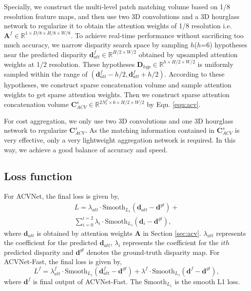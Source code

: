 \documentclass[10pt,twocolumn,letterpaper]{article}
\begin{document}
Specially, we construct the multi-level patch matching volume based on 1/8 resolution feature maps, and then use two 3D convolutions and a 3D hourglass network to regularize it to obtain the attention weights of 1/8 resolution i.e. $\mathbf{A}^{f}\in\mathbb{R}^{1\times{D}/8\times{H}/8\times{W}/8}$. To achieve real-time performance without sacrificing too much accuracy, we narrow disparity search space by sampling $h$($h$=6) hypotheses near the predicted disparity $\mathbf{d}_{att}^{f}\in\mathbb{R}^{H/2\times{W/2}}$ obtained by upsampled attention weights at 1/2 resolution. These hypotheses $\mathbf{D}_{hyp}\in\mathbb{R}^{h\times{H/2}\times{W/2}}$ is uniformly sampled within the range of $(\mathbf{d}_{att}^{f}-h/2, \mathbf{d}_{att}^{f}+h/2)$. According to these hypotheses, we construct sparse concatenation volume and sample attention weights to get sparse attention weights. Then we construct sparse attention 
concatenation volume $\mathbf{C}_{ACV}^s\in\mathbb{R}^{2N_c^f\times{6}\times{H}/2\times{W}/2}$ by Equ. \ref{equ:acv}.

For cost aggregation, we only use two 3D convolutions and one 3D hourglass network to regularize $\mathbf{C}_{ACV}^s$. As the matching information contained in $\mathbf{C}_{ACV}^s$ is very effective, only a very lightweight aggregation network is required.
In this way, we achieve a good balance of accuracy and speed.

\subsection{Loss function} \label{sec:loss}
For ACVNet, the final loss is given by,
\begin{equation}
\begin{split}
	L=\lambda_{att}\cdot\text{Smooth}_{L_1}(\mathbf{{d}}_{att}-\mathbf{d}^{gt})+\\ \sum_{i=0}^{i=2}\lambda_i\cdot\text{Smooth}_{L_1}(\mathbf{d}_i-\mathbf{d}^{gt}),
\end{split}
\label{equ:loss}
\end{equation}
where $\mathbf{d}_{att}$ is obtained by attention weights $\mathbf{A}$ in Section \ref{sec:acv}. $\lambda_{att}$ represents the coefficient for the predicted $\mathbf{{d}}_{att}$,  $\lambda_i$ represents the coefficient for the $ith$ predicted disparity and $\mathbf{d}^{gt}$ denotes the ground-truth disparity map. 
For ACVNet-Fast, the final loss is given by,
\begin{equation}
	L^{f}=\lambda_{att}^f\cdot\text{Smooth}_{L_1}(\mathbf{{d}}_{att}^f-\mathbf{d}^{gt})+\lambda^f\cdot\text{Smooth}_{L_1}(\mathbf{{d}}^f-\mathbf{d}^{gt}),
\label{equ:loss}
\end{equation}
where $\mathbf{d}^f$ is final output of ACVNet-Fast. The $\text{Smooth}_{L_1}$ is the smooth L1 loss.
\end{document}
